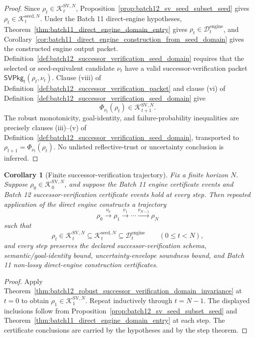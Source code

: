 \documentclass[11pt]{article}
\newtheorem{corollary}[theorem]{Corollary}
\newcommand{\1}{\mathbf{1}}
\providecommand{\Dcal}{\mathcal{D}}
\providecommand{\Kcal}{\mathcal{K}}
\begin{document}
\begin{proof}
Since \(\rho_t\in\Kcal_t^{\mathrm{SV},N}\), Proposition~\ref{prop:batch12_sv_seed_subset_seed} gives \(\rho_t\in\Kcal_t^{\mathrm{seed},N}\).  Under the Batch 11 direct-engine hypotheses, Theorem~\ref{thm:batch11_direct_engine_domain_entry} gives \(\rho_t\in\Dcal_t^{\mathrm{engine}}\), and Corollary~\ref{cor:batch11_direct_engine_construction_from_seed_domain} gives the constructed engine output packet.  Definition~\ref{def:batch12_successor_verification_seed_domain} requires that the selected or seed-equivalent candidate \(\nu_t\) have a valid successor-verification packet \(\mathsf{SVPkg}_t(\rho_t,\nu_t)\).  Clause (viii) of Definition~\ref{def:batch12_successor_verification_packet} and clause (vi) of Definition~\ref{def:batch12_successor_verification_seed_domain} give
\[
\Phi_{\nu_t}(\rho_t)
\in
\Kcal_{t+1}^{\mathrm{SV},N}.
\]
The robust monotonicity, goal-identity, and failure-probability inequalities are precisely clauses (iii)--(v) of Definition~\ref{def:batch12_successor_verification_seed_domain}, transported to \(\rho_{t+1}=\Phi_{\nu_t}(\rho_t)\).  No unlisted reflective-trust or uncertainty conclusion is inferred.
\end{proof}

\begin{corollary}[Finite successor-verification trajectory]
\label{cor:batch12_finite_sv_trajectory}
Fix a finite horizon \(N\).  Suppose \(\rho_0\in\Kcal_0^{\mathrm{SV},N}\), and suppose the Batch 11 engine certificate events and Batch 12 successor-verification certificate events hold at every step.  Then repeated application of the direct engine constructs a trajectory
\[
\rho_0\xrightarrow{\nu_0}\rho_1\xrightarrow{\nu_1}\cdots\xrightarrow{\nu_{N-1}}\rho_N
\]
such that
\[
\rho_t\in\Kcal_t^{\mathrm{SV},N}
\subseteq
\Kcal_t^{\mathrm{seed},N}
\subseteq
\Dcal_t^{\mathrm{engine}}
\qquad(0\le t<N),
\]
and every step preserves the declared successor-verification schema, semantic/goal-identity bound, uncertainty-envelope soundness bound, and Batch 11 non-lossy direct-engine construction certificates.
\end{corollary}

\begin{proof}
Apply Theorem~\ref{thm:batch12_robust_successor_verification_domain_invariance} at \(t=0\) to obtain \(\rho_1\in\Kcal_1^{\mathrm{SV},N}\).  Repeat inductively through \(t=N-1\).  The displayed inclusions follow from Proposition~\ref{prop:batch12_sv_seed_subset_seed} and Theorem~\ref{thm:batch11_direct_engine_domain_entry} at each step.  The certificate conclusions are carried by the hypotheses and by the step theorem.
\end{proof}
\end{document}
